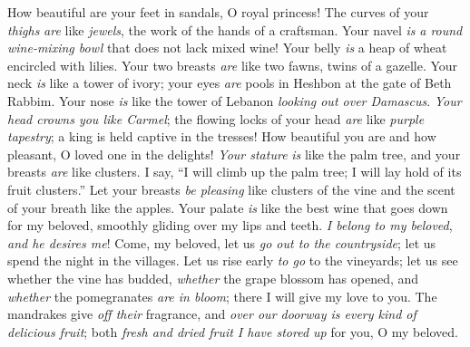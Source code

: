 \begin{biblechapter} %
 How beautiful are your feet in sandals, 
O royal princess! 
The curves of your \textit{thighs} \textit{are} like \textit{jewels}, 
the work of the hands of a craftsman.
\verse Your navel \textit{is} \textit{a round wine-mixing bowl} 
that does not lack mixed wine! 
Your belly \textit{is} a heap of wheat 
encircled with lilies.
\verse Your two breasts \textit{are} like two fawns, 
twins of a gazelle.
\verse Your neck \textit{is} like a tower of ivory; 
your eyes \textit{are} pools in Heshbon at the gate of Beth Rabbim. 
Your nose \textit{is} like the tower of Lebanon 
\textit{looking out over Damascus}.
\verse \textit{Your head crowns you like Carmel}; 
the flowing locks of your head \textit{are} like \textit{purple tapestry}; 
a king is held captive in the tresses!
\verse How beautiful you are and how pleasant, 
O loved one in the delights!
\verse \textit{Your stature} \textit{is} like the palm tree, 
and your breasts \textit{are} like clusters.
\verse I say, “I will climb up the palm tree; 
I will lay hold of its fruit clusters.” 
Let your breasts \textit{be pleasing} like clusters of the vine 
and the scent of your breath like the apples.
\verse Your palate \textit{is} like the best wine that goes down for my beloved, 
smoothly gliding over my lips and teeth.
 \textit{I belong to my beloved}, 
\textit{and he desires me}!
 Come, my beloved, let us \textit{go out to the countryside}; 
let us spend the night in the villages.
\verse Let us rise early \textit{to go} to the vineyards; 
let us see whether the vine has budded, 
\textit{whether} the grape blossom has opened, 
and \textit{whether} the pomegranates \textit{are in bloom}; 
there I will give my love to you.
\verse The mandrakes give \textit{off their} fragrance, 
and \textit{over our doorway is every kind of delicious fruit}; 
both \textit{fresh and dried fruit I have stored up} for you, O my beloved.
\end{biblechapter}

